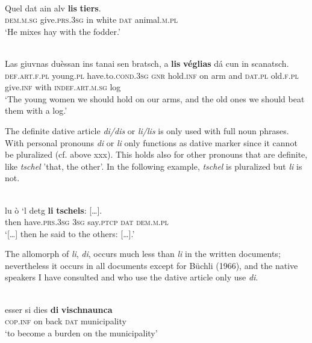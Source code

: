 \ea\label{}
\\
\gll  Quel dat ain alv \textbf{lis} \textbf{tiers}.  \\
     \textsc{dem.m.sg} give.\textsc{prs.3sg} in white \textsc{dat} animal.\textsc{m.pl}\\
\glt `He mixes hay with the fodder.'
\z

\ea\label{}
\\
\gll   Las giuvnas duèssan ins tanai sen bratsch, a \textbf{lis} \textbf{véglias} dá cun in scanatsch.\\
    \textsc{def.art.f.pl} young.\textsc{pl} have.to.\textsc{cond.3sg} \textsc{gnr} hold.\textsc{inf} on arm and \textsc{dat.pl} old.\textsc{f.pl} give.\textsc{inf} with \textsc{indef.art.m.sg} log\\
\glt `The young women we should hold on our arms, and the old ones we should beat them with a log.'
\z





The definite dative article \textit{di/dis} or \textit{li/lis} is only used with full noun phrases. With personal pronouns \textit{di} or \textit{li} only functions as dative marker since it cannot be pluralized (cf. above xxx). This holds also for other pronouns that are definite, like \textit{tschel} 'that, the other'. In the following example, \textit{tschel} is pluralized but \textit{li} is not.

\ea\label{}
\\
\gll  […] lu ò ‘l detg \textbf{li} \textbf{tschels}: […].\\
      […] then have.\textsc{prs.3sg} \textsc{3sg} say.\textsc{ptcp} \textsc{dat} \textsc{dem.m.pl}\\
\glt `[…] then he said to the others: […].'
\z


The allomorph of \textit{li}, \textit{di}, occurs much less than \textit{li} in the written documents; nevertheless it occurs in all documents except for Büchli (1966), and the native speakers I have consulted and who use the dative article only use \textit{di}.

\ea\label{ex:1:}
\\
\gll  esser si dies \textbf{di} \textbf{vischnaunca}  \\
     \textsc{cop.inf} on back \textsc{dat} municipality\\
\glt `to become a burden on the municipality'
\z


